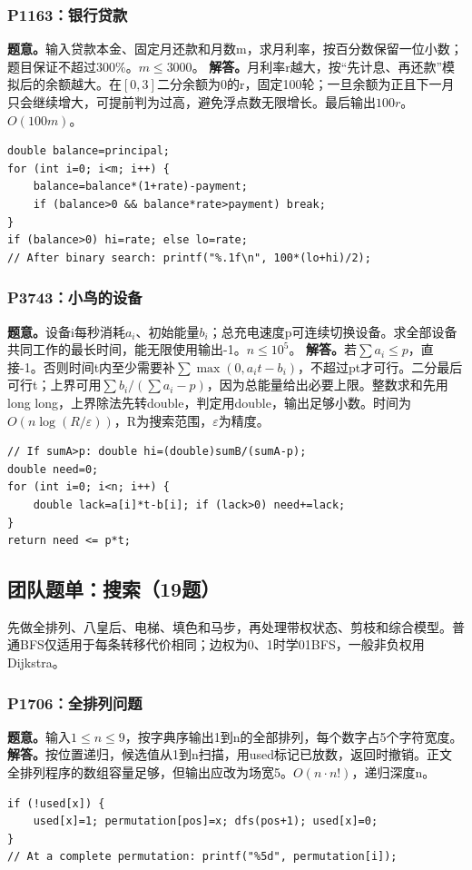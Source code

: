\subsubsection{P1163：银行贷款}
\textbf{题意。}输入贷款本金、固定月还款和月数m，求月利率，按百分数保留一位小数；题目保证不超过300\%。$m\le3000$。
\textbf{解答。}月利率r越大，按“先计息、再还款”模拟后的余额越大。在$[0,3]$二分余额为0的r，固定100轮；一旦余额为正且下一月只会继续增大，可提前判为过高，避免浮点数无限增长。最后输出$100r$。$O(100m)$。
\begin{lstlisting}
double balance=principal;
for (int i=0; i<m; i++) {
    balance=balance*(1+rate)-payment;
    if (balance>0 && balance*rate>payment) break;
}
if (balance>0) hi=rate; else lo=rate;
// After binary search: printf("%.1f\n", 100*(lo+hi)/2);
\end{lstlisting}

\subsubsection{P3743：小鸟的设备}
\textbf{题意。}设备i每秒消耗$a_i$、初始能量$b_i$；总充电速度p可连续切换设备。求全部设备共同工作的最长时间，能无限使用输出-1。$n\le10^5$。
\textbf{解答。}若$\sum a_i\le p$，直接-1。否则时间t内至少需要补$\sum\max(0,a_it-b_i)$，不超过pt才可行。二分最后可行t；上界可用$\sum b_i/(\sum a_i-p)$，因为总能量给出必要上限。整数求和先用long long，上界除法先转double，判定用double，输出足够小数。时间为$O(n\log(R/\varepsilon))$，R为搜索范围，$\varepsilon$为精度。
\begin{lstlisting}
// If sumA>p: double hi=(double)sumB/(sumA-p);
double need=0;
for (int i=0; i<n; i++) {
    double lack=a[i]*t-b[i]; if (lack>0) need+=lack;
}
return need <= p*t;
\end{lstlisting}

\subsection{团队题单：搜索（19题）}
先做全排列、八皇后、电梯、填色和马步，再处理带权状态、剪枝和综合模型。普通BFS仅适用于每条转移代价相同；边权为0、1时学01BFS，一般非负权用Dijkstra。

\subsubsection{P1706：全排列问题}
\textbf{题意。}输入$1\le n\le9$，按字典序输出1到n的全部排列，每个数字占5个字符宽度。
\textbf{解答。}按位置递归，候选值从1到n扫描，用used标记已放数，返回时撤销。正文全排列程序的数组容量足够，但输出应改为场宽5。$O(n\cdot n!)$，递归深度n。
\begin{lstlisting}
if (!used[x]) {
    used[x]=1; permutation[pos]=x; dfs(pos+1); used[x]=0;
}
// At a complete permutation: printf("%5d", permutation[i]);
\end{lstlisting}

